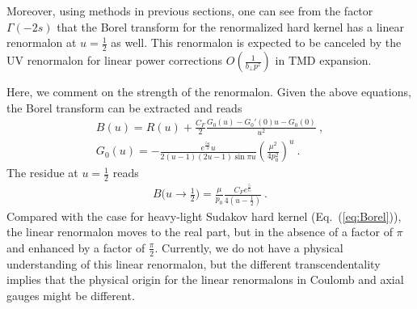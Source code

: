 \documentclass[a4paper,11pt]{article}
\begin{document}
Moreover, using methods in previous sections, one can see from the factor $\Gamma(-2s)$ that the Borel transform for the renormalized hard kernel has a linear renormalon at $u=\frac{1}{2}$ as well. This renormalon is expected to be canceled by the UV renormalon for linear power corrections $O\left(\frac{1}{b_{\perp}p^z}\right)$ in TMD expansion. 

Here, we comment on the strength of the renormalon.  Given the above equations, the Borel transform can be extracted and reads
\begin{align}
B(u)=R(u)+\frac{C_F}{2}\frac{G_0(u)-G_{0}'(0)u-G_{0}(0)}{u^2} \ , \\ 
G_0(u)=-\frac{e^{\frac{5 u}{3}} u}{2(u-1) (2 u-1)\sin \pi u }\left(\frac{\mu^2}{4p_0^2}\right)^u \ .
\end{align}
The residue at $u=\frac{1}{2}$ reads
\begin{align}
B\bigg (u\rightarrow \frac{1}{2} \bigg)=\frac{\mu}{p_0}\frac{C_Fe^{\frac{5}{6}}}{4(u-\frac{1}{2})} \ .
\end{align}
Compared with the case for heavy-light Sudakov hard kernel (Eq.~(\ref{eq:Borel})),  the linear renormalon moves to the real part, but in the absence of a factor of $\pi$ and enhanced by a factor of $\frac{\pi}{2}$. Currently, we do not have a physical understanding of this linear renormalon, but the different transcendentality implies that the physical origin for the linear renormalons in Coulomb and axial gauges might be different. 
\end{document}
